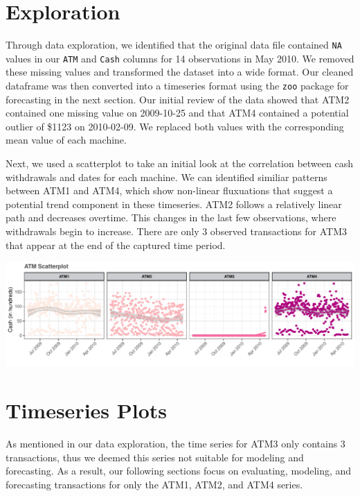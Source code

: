 \documentclass[openany]{book}
\begin{document}
\hypertarget{exploration}{%
\section{Exploration}\label{exploration}}

Through data exploration, we identified that the original data file
contained \texttt{NA} values in our \texttt{ATM} and \texttt{Cash}
columns for 14 observations in May 2010. We removed these missing values
and transformed the dataset into a wide format. Our cleaned dataframe
was then converted into a timeseries format using the \texttt{zoo}
package for forecasting in the next section. Our initial review of the
data showed that ATM2 contained one missing value on 2009-10-25 and that
ATM4 contained a potential outlier of \$1123 on 2010-02-09. We replaced
both values with the corresponding mean value of each machine.

Next, we used a scatterplot to take an initial look at the correlation
between cash withdrawals and dates for each machine. We can identified
similiar patterns between ATM1 and ATM4, which show non-linear
fluxuations that suggest a potential trend component in these
timeseries. ATM2 follows a relatively linear path and decreases
overtime. This changes in the last few observations, where withdrawals
begin to increase. There are only 3 observed transactions for ATM3 that
appear at the end of the captured time period.

\includegraphics{Part-A-JM_files/figure-latex/unnamed-chunk-2-1.pdf}

\hypertarget{timeseries-plots}{%
\section{Timeseries Plots}\label{timeseries-plots}}

As mentioned in our data exploration, the time series for ATM3 only
contains 3 transactions, thus we deemed this series not suitable for
modeling and forecasting. As a result, our following sections focus on
evaluating, modeling, and forecasting transactions for only the ATM1,
ATM2, and ATM4 series.
\end{document}
